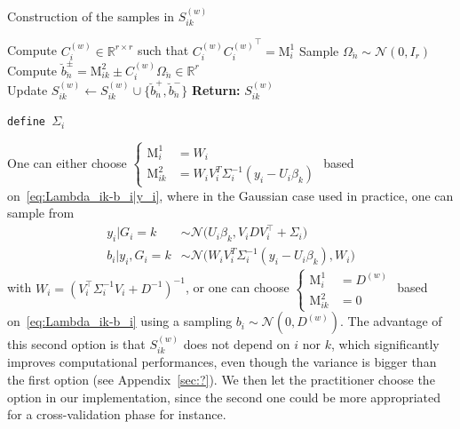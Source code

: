 \documentclass[11pt]{article}
\newcommand{\cN}{\mathcal N}
\newcommand{\R}{\mathds R}
\begin{document}
\vspace{.5cm}

\begin{algorithm}[H]
\DontPrintSemicolon
\caption{Construction of the samples in $S_{ik}^{(w)}$}
\label{alg:construct-set-S}
Compute $C_i^{(w)} \in \R^{r \times r}$ such that 
$C_i^{(w)}{C_i^{(w)}}^\top = \text{M}_i^1$  \nonumber
{}    
{ 
  Sample $\Omega_{\breve{n}} \sim \cN(0, I_r)$ \\
  Compute $\breve{b}_{\breve{n}}^\pm = \text{M}_{ik}^2 \pm C_i^{(w)} \Omega_{\breve{n}} \in \R^r$ \\
  Update $S_{ik}^{(w)} \leftarrow S_{ik}^{(w)} \cup \{\breve{b}_{\breve{n}}^+, \breve{b}_{\breve{n}}^- \}$
}
\textbf{Return:} {$S_{ik}^{(w)}$}
\end{algorithm}

\vspace{.5cm}

\texttt{define $\Sigma_i$}

\noindent One can either choose $\left\{ \begin{array}{ll} \text{M}_i^1 &= W_i \\ \text{M}_{ik}^2 &= W_iV_i^T\Sigma_i^{-1}(y_i - U_i\beta_k) \end{array} \right.$ based on~\eqref{eq:Lambda_ik-b_i|y_i}, where in the Gaussian case used in practice, one can sample from
\begin{align*}
  y_i | G_i = k &\sim \cN\big(U_i\beta_k, V_iDV_i^\top + \Sigma_i\big) \\
  b_i | y_i, G_i=k &\sim \cN \big(W_iV_i^T\Sigma_i^{-1}(y_i - U_i\beta_k), W_i\big)  
\end{align*}
with $W_i = (V_i^\top\Sigma_i^{-1}V_i + D^{-1})^{-1}$, or one can choose $\left\{ \begin{array}{ll} \text{M}_i^1 &= D^{(w)} \\ \text{M}_{ik}^2 &= 0 \end{array} \right.$ based on~\eqref{eq:Lambda_ik-b_i} using a sampling $b_i \sim \cN(0, D^{(w)})$. The advantage of this second option is that $S_{ik}^{(w)}$ does not depend on $i$ nor $k$, which significantly improves computational performances, even though the variance is bigger than the first option (see Appendix~\ref{sec:?}). We then let the practitioner choose the option in our implementation, since the second one could be more appropriated for a cross-validation phase for instance.
\end{document}

